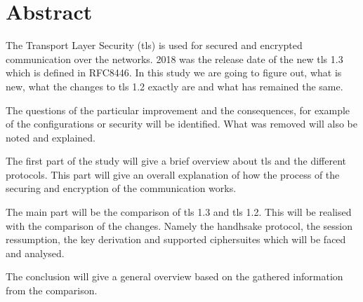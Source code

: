 \chapter*{Abstract}
\label{chap:abstract}
The Transport Layer Security (\gls{tls}) is used for secured and encrypted communication over the networks. 2018 was the release date of the new \gls{tls} 1.3 which is defined in RFC8446. In this study we are going to figure out, what is new, what the changes to \gls{tls} 1.2 exactly are and what has remained the same. 

The questions of the particular improvement and the consequences, for example of the configurations or security will be identified. What was removed will also be noted and explained.

The first part of the study will give a brief overview about \gls{tls} and the different protocols. This part will give an overall explanation of how the process of the securing and encryption of the communication works. 

The main part will be the comparison of \gls{tls} 1.3 and \gls{tls} 1.2. This will be realised with the comparison of the changes. Namely the handhsake protocol, the session ressumption, the key derivation and supported ciphersuites which will be faced and analysed.

The conclusion will give a general overview based on the gathered information from the comparison.



